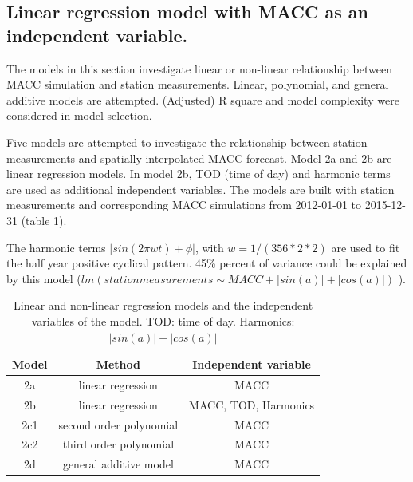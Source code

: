 \documentclass{article}
\begin{document}
\subsection{Linear regression model with MACC as an independent variable.}

The models in this section investigate linear or non-linear relationship between MACC simulation and station measurements. Linear, polynomial, and general additive models are attempted. (Adjusted) R square and model complexity were considered in model selection.  
  
Five models are attempted to investigate the relationship between station measurements and spatially interpolated MACC forecast. Model 2a and 2b are linear regression models. In model 2b, TOD (time of day) and harmonic terms are  used as additional independent variables. The models are built with station measurements and corresponding MACC simulations from 2012-01-01 to 2015-12-31 (table 1).   

The harmonic terms   
$|sin(2 \pi wt) + \phi|$, 
with $w = 1 / (356 * 2 * 2)$ are used to fit the half year positive cyclical pattern. 45\% percent of variance could be explained by this model ($lm (station measurements \sim MACC + |sin(a)| + |cos(a)|)$ ).  

\begin{table}[h!]
\centering
\begin{tabular}{ c c c }
Model & Method & Independent variable\\ \hline 

2a &linear regression & MACC   \\
2b &linear regression & MACC, TOD, Harmonics   \\
2c1 & second order polynomial & MACC \\  
2c2 & third order polynomial & MACC   \\ 
2d & general additive model & MACC  \\  \hline
\end{tabular}
\caption{ Linear and non-linear regression models and the independent variables of the model. TOD: time of day. Harmonics: $ | sin(a)| + |cos(a)|$ } 
\label{table:1}
\end{table}
\end{document}
